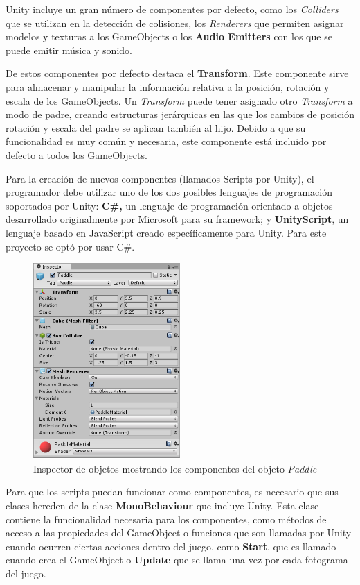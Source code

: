 Unity incluye un gran número de componentes por defecto, como los \textit{Colliders} que se utilizan en la detección de colisiones, los \textit{Renderers} que permiten asignar modelos y texturas a los GameObjects o los \textbf{Audio Emitters} con los que se puede emitir música y sonido.

De estos componentes por defecto destaca el \textbf{Transform}. Este componente sirve para almacenar y manipular la información relativa a la posición, rotación y escala de los GameObjects. Un \textit{Transform} puede tener asignado otro \textit{Transform} a modo de padre, creando estructuras jerárquicas en las que los cambios de posición rotación y escala del padre se aplican también al hijo. Debido a que su funcionalidad es muy común y necesaria, este componente está incluido por defecto a todos los GameObjects.

Para la creación de nuevos componentes (llamados Scripts por Unity), el programador debe utilizar uno de los dos posibles lenguajes de programación soportados por Unity: \textbf{C\#,} un lenguaje de programación orientado a objetos desarrollado originalmente por Microsoft para su framework; y \textbf{UnityScript}, un lenguaje basado en JavaScript creado específicamente para Unity. Para este proyecto se optó por usar C\#.

\begin{figure}[h]
	\includegraphics[width=0.5\textwidth]{images/estructura/clases/inspector}
	\centering
	\caption{Inspector de objetos mostrando los componentes del objeto \textit{Paddle}}
\end{figure}

Para que los scripts puedan funcionar como componentes, es necesario que sus clases hereden de la clase \textbf{MonoBehaviour} que incluye Unity. Esta clase contiene la funcionalidad necesaria para los componentes, como métodos de acceso a las propiedades del GameObject o funciones que son llamadas por Unity cuando ocurren ciertas acciones dentro del juego, como \textbf{Start}, que es llamado cuando crea el GameObject o \textbf{Update} que se llama una vez por cada fotograma del juego.

